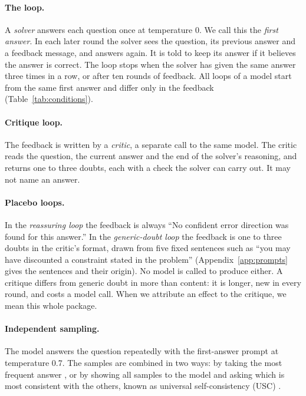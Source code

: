 \documentclass[11pt]{article}
\begin{document}
\paragraph{The loop.}
A \emph{solver} answers each question once at temperature 0. We call this the \emph{first answer}.
In each later round the solver sees the question, its previous answer and a feedback message, and answers again. It is told to keep its answer if it believes the answer is correct.
The loop stops when the solver has given the same answer three times in a row, or after ten rounds of feedback.
All loops of a model start from the same first answer and differ only in the feedback (Table~\ref{tab:conditions}).

\paragraph{Critique loop.}
The feedback is written by a \emph{critic}, a separate call to the same model.
The critic reads the question, the current answer and the end of the solver's reasoning, and returns one to three doubts, each with a check the solver can carry out. It may not name an answer.

\paragraph{Placebo loops.}
In the \emph{reassuring loop} the feedback is always ``No confident error direction was found for this answer.''
In the \emph{generic-doubt loop} the feedback is one to three doubts in the critic's format, drawn from five fixed sentences such as ``you may have discounted a constraint stated in the problem'' (Appendix~\ref{app:prompts} gives the sentences and their origin).
No model is called to produce either.
A critique differs from generic doubt in more than content: it is longer, new in every round, and costs a model call. When we attribute an effect to the critique, we mean this whole package.

\paragraph{Independent sampling.}
The model answers the question repeatedly with the first-answer prompt at temperature 0.7.
The samples are combined in two ways: by taking the most frequent answer \citep{wang2023selfconsistency}, or by showing all samples to the model and asking which is most consistent with the others, known as universal self-consistency (USC) \citep{chen2023usc}.
\end{document}
